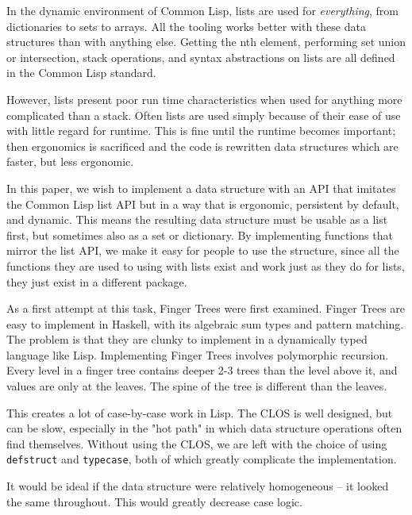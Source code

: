 \documentclass[sigconf]{acmart}
\begin{document}
In the dynamic environment of Common Lisp, lists are used for
\emph{everything}, from dictionaries to sets to arrays. All the tooling works
better with these data structures than with anything else. Getting the nth
element, performing set union or intersection, stack operations, and syntax
abstractions on lists are all defined in the Common Lisp standard.

However, lists present poor run time characteristics when used for anything more
complicated than a stack. Often lists are used simply because of their ease of
use with little regard for runtime. This is fine until the runtime becomes
important; then ergonomics is sacrificed and the code is rewritten data
structures which are faster, but less ergonomic.

In this paper, we wish to implement a data structure with an API that imitates
the Common Lisp list API but in a way that is ergonomic, persistent by default,
and dynamic. This means the resulting data structure must be usable as a list
first, but sometimes also as a set or dictionary. By implementing functions
that mirror the list API, we make it easy for people to use the structure, since
all the functions they are used to using with lists exist and work just as they
do for lists, they just exist in a different package.

As a first attempt at this task, Finger Trees \cite{Hinze-Paterson:FingerTree}
were first examined. Finger Trees are easy
to implement in Haskell, with its algebraic sum types and pattern matching. The
problem is that they are clunky to implement in a dynamically typed language
like Lisp. Implementing Finger Trees involves polymorphic recursion. Every level
in a finger tree contains deeper 2-3 trees than the level above it, and values
are only at the leaves. The spine of the tree is different than the leaves.

This creates a lot of case-by-case work in Lisp. The CLOS is well designed, but
can be slow, especially in the "hot path" in which data structure operations
often find themselves. Without using the CLOS, we are left with the choice of
using \texttt{defstruct} and \texttt{typecase}, both of which greatly complicate
the implementation.

It would be ideal if the data structure were relatively homogeneous -- it looked
the same throughout. This would greatly decrease case logic.
\end{document}
